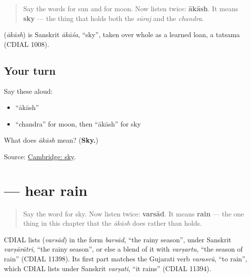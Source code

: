 \label{lesson:GU-C29-hear-aakaash}



\begin{quote}
Say the words for sun and for moon. Now listen twice: \textbf{ākāsh}. It means \textbf{sky} — the thing that holds both the \emph{sūraj} and the \emph{chandra}.
\end{quote}

\begin{cousinweb}
\textbf{} (\emph{ākāsh}) is Sanskrit \emph{ākāśa}, \textquotedblleft{}sky\textquotedblright{}, taken over whole as a learned loan, a tatsama (CDIAL 1008).
\end{cousinweb}

\subsection*{Your turn}
Say these aloud:

\begin{itemize}
\raggedright
  \item \textquotedblleft{}ākāsh\textquotedblright{}
  \item \textquotedblleft{}chandra\textquotedblright{} for moon, then \textquotedblleft{}ākāsh\textquotedblright{} for sky
\end{itemize}

\begin{tcolorbox}[breakable,colback=teal!4,colframe=teal!35!black,title={Before you move on}]
What does \emph{ākāsh} mean? (\textbf{Sky.})

Source: \href{https://dictionary.cambridge.org/dictionary/english-gujarati/sky}{Cambridge: sky}.
\end{tcolorbox}
\section[\texorpdfstring{\gu{વરસાદ} (varsād)}{વરસાદ (varsād)}]{ — hear rain}

\label{lesson:GU-C29-hear-varsaad}



\begin{quote}
Say the word for sky. Now listen twice: \textbf{varsād}. It means \textbf{rain} — the one thing in this chapter that the \emph{ākāsh} does rather than holds.
\end{quote}

\begin{cousinweb}
CDIAL lists \textbf{} (\emph{varsād}) in the form \emph{barsād}, \textquotedblleft{}the rainy season\textquotedblright{}, under Sanskrit \emph{varṣārātri}, \textquotedblleft{}the rainy season\textquotedblright{}, or else a blend of it with \emph{varṣartu}, \textquotedblleft{}the season of rain\textquotedblright{} (CDIAL 11398). Its first part matches the Gujarati verb \emph{varasvũ}, \textquotedblleft{}to rain\textquotedblright{}, which CDIAL lists under Sanskrit \emph{varṣati}, \textquotedblleft{}it rains\textquotedblright{} (CDIAL 11394).
\end{cousinweb}

